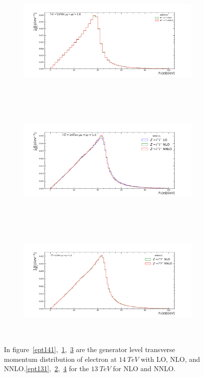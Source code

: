 \begin{figure}[H]
\begin{subfigure}{0.49\textwidth}
\vspace*{-8mm}
\caption{}
\label{ept142}
\end{subfigure}
\begin{subfigure}{0.49\textwidth}
\includegraphics[height=6cm, width=\textwidth]{chapter4/Ewmpt_rf1_13.pdf}
\vspace*{-8mm}
\caption{}
\label{ept132}
\end{subfigure}
\begin{subfigure}{0.49\textwidth}
\includegraphics[height=6cm, width=\textwidth]{chapter4/Ezpt_rf1_14.pdf}
\vspace*{-8mm}
\caption{}
\label{ept143}
\end{subfigure}
\begin{subfigure}{0.49\textwidth}
\includegraphics[height=6cm, width=\textwidth]{chapter4/Ezpt_rf1_13.pdf}
\vspace*{-8mm}
\caption{}
\label{ept133}
\end{subfigure}
\caption{In figure~\ref{ept141},~\ref{ept142},~\ref{ept143} are the generator level transverse momentum distribution of electron at $14~TeV$ with LO, NLO, and NNLO.\ref{ept131},~\ref{ept132},~\ref{ept133} for the $13~TeV$ for NLO and NNLO.}  
\label{elec}
\end{figure}




